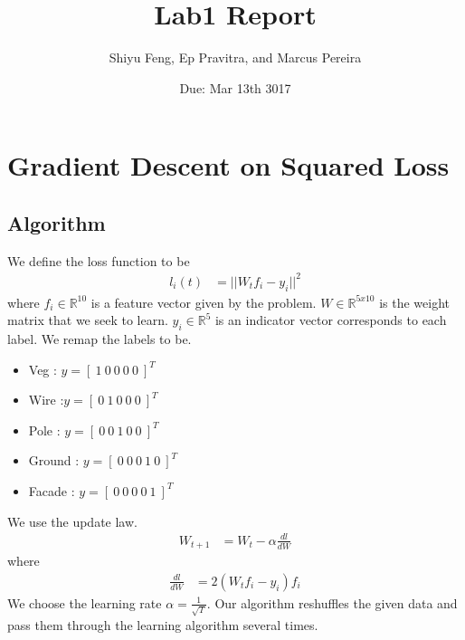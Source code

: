 \documentclass[letterpaper]{article}
\title{Lab1 Report }
\date{Due: Mar 13th 3017}
\author{Shiyu Feng, Ep Pravitra, and Marcus Pereira}
\begin{document}
\maketitle

\section{Gradient Descent on Squared Loss}

\subsection{Algorithm}
We define the loss function to be
\begin{align}
l_i (t) &= ||W_t f_i - y_i||^2
\end{align}
where $f_i \in  \mathbb{R}^{10}$ is a feature vector given by the problem.  $W \in  \mathbb{R}^{5x10}$ is the weight matrix that we seek to learn. $y_i \in  \mathbb{R}^5$ is an indicator vector corresponds to each label. We remap the labels to be.
\begin{itemize}
\item Veg : $y = [ \ 1 \ 0 \ 0 \ 0 \ 0 \ ]^T$
\item Wire :$y = [ \ 0 \ 1 \ 0 \ 0 \ 0 \ ]^T$
\item Pole : $y = [ \ 0 \ 0 \ 1 \ 0 \ 0 \ ]^T$
\item Ground : $y = [ \ 0 \ 0 \ 0 \ 1 \ 0 \ ]^T$
\item Facade : $y = [ \ 0 \ 0 \ 0 \ 0 \ 1 \ ]^T$
\end{itemize}
We use the update law.
\begin{align}
W_{t+1} &= W_t - \alpha  \frac{d l}{d W}
\end{align}
where 
\begin{align}
 \frac{d l}{d W} &= 2(W_t f_i - y_i) f_i
\end{align}
We choose the learning rate $\alpha = \frac{1}{\sqrt{T}}$. Our algorithm reshuffles the given data and pass them through the learning algorithm several times.  
\end{document}
